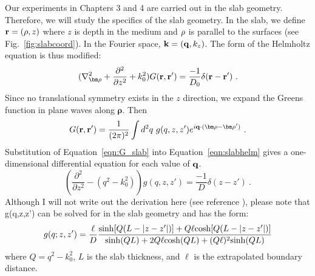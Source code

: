Our experiments in Chapters 3 and 4 are carried out in the slab geometry. Therefore, we will study the specifics of the slab geometry. In the slab, we define $\mathbf{r} = (\mathbf{\rho},z)$ where $z$ is depth in the medium and $\mathbf{\rho}$ is parallel to the surfaces (see Fig.~\ref{fig:slabcoord}). In the Fourier space, $\mathbf{k}=(\mathbf{q},k_z)$. The form of the Helmholtz equation is thus modified: 
\begin{equation}
\label{eqn:slabhelm}
(\nabla^2_{{\bm \rho}} + \frac{\partial^2}{\partial z^2} + k_0^2)G(\mbf{r},\mbf{r}^{\prime}) = \frac{-1}{D_0} \delta (\mbf{r}-\mbf{r}^{\prime}) \ .
\end{equation}
Since no translational symmetry exists in the $z$ direction, we expand the Greens function in plane waves along ${\bm \rho}$. Then
\begin{equation}
\label{eqn:G_slab}
G(\mbf{r},\mbf{r'}) = \frac{1}{(2\pi)^2} \int d^2q \ g(q,z,z') e^{i\mbf{q} \cdot ({\bm \rho}-{\bm \rho}^{\prime})} \ .
\end{equation}
\label{eqn:g_1d}
Substitution of Equation~\ref{eqn:G_slab} into Equation~\ref{eqn:slabhelm} gives a one-dimensional differential equation for each value of $\mathbf{q}$.
\begin{equation}
\left(\frac{\partial^2}{\partial z^2} - (q^2-k_0^2) \right) g(q,z,z') = \frac{-1}{D} \delta (z-z') \ .
\end{equation}
Although I will not write out the derivation here (see reference \cite{Konecky2008,Konecky2008a}), please note that g(q,z,z') can be solved for in the slab geometry and has the form:
\begin{equation}
\label{eqn:g_slab}
g(q;z,z') = \frac{\ell}{D} \frac{{\rm sinh}[Q(L-|z-z'|)]+Q\ell {\rm cosh}[Q(L-|z-z'|)]}{{\rm sinh}(QL)+2Q\ell {\rm cosh}(QL)+(Q\ell)^2{\rm sinh}(QL)}
\end{equation}
where $Q = q^2 -k_0^2$, $L$ is the slab thickness, and $\ell$ is the extrapolated boundary distance.


